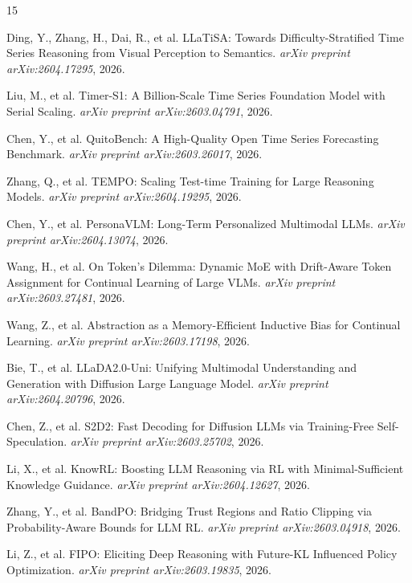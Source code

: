 \documentclass[11pt]{article}
\begin{document}
\begin{thebibliography}{15}

Ding, Y., Zhang, H., Dai, R., et al.
\newblock LLaTiSA: Towards Difficulty-Stratified Time Series Reasoning from Visual Perception to Semantics.
\newblock \emph{arXiv preprint arXiv:2604.17295}, 2026.

Liu, M., et al.
\newblock Timer-S1: A Billion-Scale Time Series Foundation Model with Serial Scaling.
\newblock \emph{arXiv preprint arXiv:2603.04791}, 2026.

Chen, Y., et al.
\newblock QuitoBench: A High-Quality Open Time Series Forecasting Benchmark.
\newblock \emph{arXiv preprint arXiv:2603.26017}, 2026.

Zhang, Q., et al.
\newblock TEMPO: Scaling Test-time Training for Large Reasoning Models.
\newblock \emph{arXiv preprint arXiv:2604.19295}, 2026.

Chen, Y., et al.
\newblock PersonaVLM: Long-Term Personalized Multimodal LLMs.
\newblock \emph{arXiv preprint arXiv:2604.13074}, 2026.

Wang, H., et al.
\newblock On Token's Dilemma: Dynamic MoE with Drift-Aware Token Assignment for Continual Learning of Large VLMs.
\newblock \emph{arXiv preprint arXiv:2603.27481}, 2026.

Wang, Z., et al.
\newblock Abstraction as a Memory-Efficient Inductive Bias for Continual Learning.
\newblock \emph{arXiv preprint arXiv:2603.17198}, 2026.

Bie, T., et al.
\newblock LLaDA2.0-Uni: Unifying Multimodal Understanding and Generation with Diffusion Large Language Model.
\newblock \emph{arXiv preprint arXiv:2604.20796}, 2026.

Chen, Z., et al.
\newblock S2D2: Fast Decoding for Diffusion LLMs via Training-Free Self-Speculation.
\newblock \emph{arXiv preprint arXiv:2603.25702}, 2026.

Li, X., et al.
\newblock KnowRL: Boosting LLM Reasoning via RL with Minimal-Sufficient Knowledge Guidance.
\newblock \emph{arXiv preprint arXiv:2604.12627}, 2026.

Zhang, Y., et al.
\newblock BandPO: Bridging Trust Regions and Ratio Clipping via Probability-Aware Bounds for LLM RL.
\newblock \emph{arXiv preprint arXiv:2603.04918}, 2026.

Li, Z., et al.
\newblock FIPO: Eliciting Deep Reasoning with Future-KL Influenced Policy Optimization.
\newblock \emph{arXiv preprint arXiv:2603.19835}, 2026.

\end{thebibliography}
\end{document}
